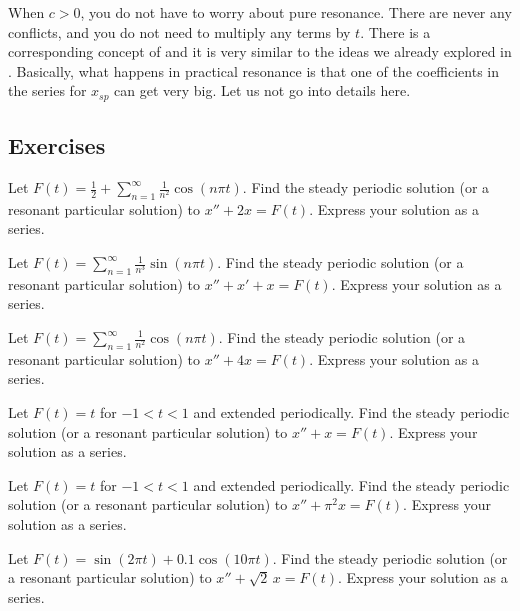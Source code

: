 When $c > 0$, you do not have to worry about pure resonance.
There are never any conflicts, and you do not need to multiply any
terms by $t$.  There is a corresponding concept of
and it is very similar to the ideas we already explored in
.
Basically, what happens in practical resonance is that one of the
coefficients in the series for $x_{sp}$ can get very big.  Let us not go
into details here.

\subsection{Exercises}

\begin{exercise}
Let $F(t) = \frac{1}{2} + \sum_{n=1}^\infty \frac{1}{n^2} \cos (n \pi t)$.
Find
the steady periodic solution (or a resonant particular solution) to
$x'' + 2 x = F(t)$.  Express your solution as a series.
\end{exercise}

\begin{exercise}
Let $F(t) = \sum_{n=1}^\infty \frac{1}{n^3} \sin (n \pi t)$.  Find
the steady periodic solution (or a resonant particular solution) to
$x'' + x' + x = F(t)$.  Express your solution as a series.
\end{exercise}

\begin{exercise}
Let $F(t) = \sum_{n=1}^\infty \frac{1}{n^2} \cos (n \pi t)$.  Find
the steady periodic solution (or a resonant particular solution) to
$x'' + 4 x = F(t)$.  Express your solution as a series.
\end{exercise}

\begin{exercise}
Let $F(t) = t$ for $-1 < t < 1$ and extended periodically.
Find the steady periodic solution (or a resonant particular solution) to
$x'' + x = F(t)$.  Express your solution as a series.
\end{exercise}

\begin{exercise}
Let $F(t) = t$ for $-1 < t < 1$ and extended periodically.
Find the steady periodic solution (or a resonant particular solution) to
$x'' + \pi^2 x = F(t)$.  Express your solution as a series.
\end{exercise}

\setcounter{exercise}{100}

\begin{exercise}
Let $F(t) = \sin(2\pi t) + 0.1 \cos(10 \pi t)$.
Find the steady periodic solution (or a resonant particular solution) to $x'' + \sqrt{2}\, x = F(t)$.
Express your solution as a series.
\end{exercise}

